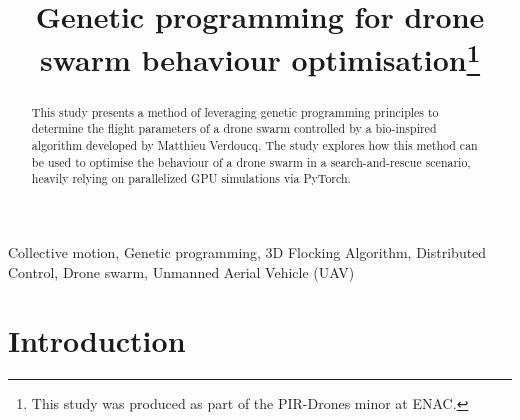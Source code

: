 \documentclass[conference]{IEEEtran}
\begin{document}
\title{\textbf{Genetic programming for drone swarm behaviour optimisation}\thanks{This study was produced as part of the PIR-Drones minor at ENAC.}}

\author{
\and
{}
}

\maketitle
\thispagestyle{plain} %
\pagestyle{plain}     %

\begin{abstract}   
This study presents a method of leveraging genetic programming principles to determine the flight parameters of a drone swarm controlled by a bio-inspired algorithm developed by Matthieu Verdoucq. The study explores how this method can be used to optimise the behaviour of a drone swarm in a search-and-rescue scenario, heavily relying on parallelized GPU simulations via PyTorch.
\end{abstract}

\begin{IEEEkeywords}
	Collective motion, Genetic programming, 3D Flocking Algorithm, Distributed Control, Drone swarm, Unmanned Aerial Vehicle (UAV)
\end{IEEEkeywords}



\section{Introduction}
\label{sec:intro}
\end{document}
